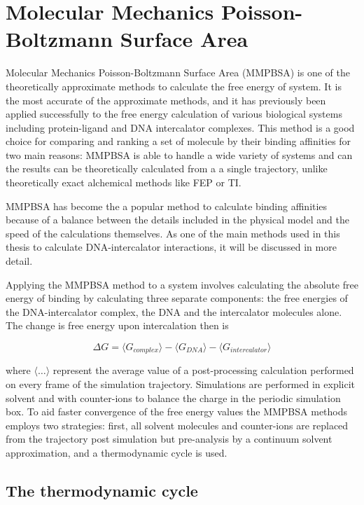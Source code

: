 \section{Molecular Mechanics Poisson-Boltzmann Surface Area}

Molecular Mechanics Poisson-Boltzmann Surface Area (MMPBSA) is one of the theoretically approximate methods to calculate the free energy of system. It is the most accurate of the approximate methods, and it has previously been applied successfully to the free energy calculation of various biological systems including protein-ligand and DNA intercalator complexes. 
This method is a good choice for comparing and ranking a set of molecule by their binding affinities for two main reasons: MMPBSA is able to handle a wide variety of systems and can the results can be theoretically calculated from a a single trajectory, unlike theoretically exact alchemical methods like FEP or TI. 

MMPBSA has become the a popular method to calculate binding affinities because of a balance between the details included in the physical model and the speed of the calculations themselves. As one of the main methods used in this thesis to calculate DNA-intercalator interactions, it will be discussed in more detail.

Applying the MMPBSA method to a system involves calculating the absolute free energy of binding by calculating three separate components: the free energies of the DNA-intercalator complex, the DNA and the intercalator molecules alone. The change is free energy upon intercalation then is

\begin{equation}
  \Delta G = \langle G_{complex} \rangle - \langle G_{DNA} \rangle - \langle G_{intercalator} \rangle
\end{equation}
\label{eq:mmpbsa}

where $\langle \dots \rangle$ represent the average value of a post-processing calculation performed on every frame of the simulation trajectory. Simulations are performed in explicit solvent and with counter-ions to balance the charge in the periodic simulation box.
To aid faster convergence of the free energy values the MMPBSA methods employs two strategies: first, all solvent molecules and counter-ions are replaced from the trajectory post simulation but pre-analysis by a continuum solvent approximation, and a thermodynamic cycle is used.

\subsection{The thermodynamic cycle}

